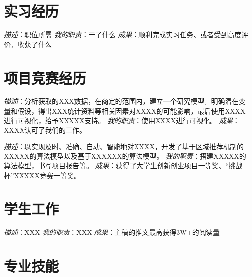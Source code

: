 \documentclass{resume}
\begin{document}
\section{实习经历}

\Content
{\textit{描述}：职位所需}
{\textit{我的职责}：干了什么}
{\textit{成果}：顺利完成实习任务、或者受到高度评价，收获了什么}



\section{项目竞赛经历}

\Content
{\textit{描述}：分析获取的XXX数据，在商定的范围内，建立一个研究模型，明确潜在变量和假设，得出XXX统计资料等相关因素对XXXX的可能影响，最后使用XXXX进行可视化，给予XXXXX支持。}
{\textit{我的职责}：使用XXXX进行可视化。}
{\textit{成果}：XXXX认可了我们的工作。}



\Content
{\textit{描述}：以实现及时、准确、自动、智能地对XXXX，开发了基于区域推荐机制的XXXXX的算法模型以及基于XXXXXX的算法模型。}
{\textit{我的职责}：搭建XXXXX的算法模型，书写项目报告等。}
{\textit{成果}：获得了大学生创新创业项目一等奖、“挑战杯”XXXXX竞赛一等奖。}



\section{学生工作}
\Content
{\textit{描述}：XXX}
{\textit{我的职责}：XXX}
{\textit{成果}：主稿的推文最高获得3W+的阅读量}



\section{专业技能}
\sepspace
\end{document}
